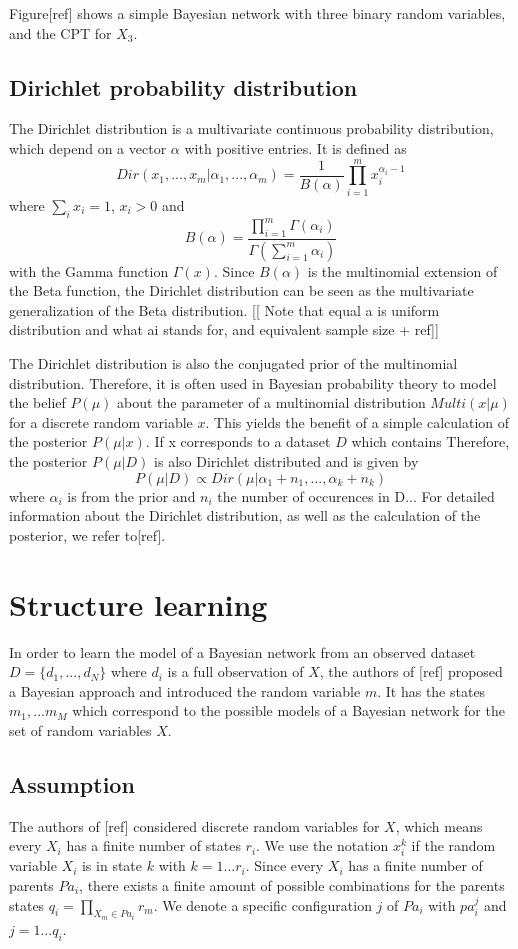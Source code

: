 \documentclass{article}
\begin{document}
	Figure[ref] shows a simple Bayesian network with three binary random variables, and
	the CPT for $X_3$.	
	 
	\subsection{Dirichlet probability distribution}
	The Dirichlet distribution is a multivariate continuous probability distribution, which depend on a
	vector $\alpha$ with positive entries. It is defined as
	\[
		Dir(x_1,...,x_m|\alpha_1, ..., \alpha_{m})=\frac{1}{B(\alpha)}\prod_{i=1}^m x_i^{\alpha_i -1}
	\]
	where $\sum_i x_i = 1$, $x_i>0$ and 
	\[
		B(\alpha)=\frac{\prod_{i=1}^m\Gamma(\alpha_i)}{\Gamma(\sum_{i=1}^m \alpha_i)}
	\]
	with the Gamma function $\Gamma(x)$. Since $B(\alpha)$ is the multinomial extension of the Beta function,
	the Dirichlet distribution can be seen as the	multivariate generalization of the Beta distribution.
	[[ Note that equal a is uniform distribution and what ai stands for, and equivalent sample size + ref]]
	
	The Dirichlet distribution is also the conjugated prior of the multinomial distribution.
	Therefore, it is often used in Bayesian probability theory to model the belief $P(\mu)$ about the
	parameter of a multinomial distribution $Multi(x|\mu)$ for a discrete random variable $x$.
	This yields the benefit of a simple calculation of the posterior $P(\mu|x)$. If x corresponds to
	a dataset $D$ which contains
	Therefore, the posterior $P(\mu|D)$ is also Dirichlet distributed and is given by
	\[
		P(\mu|D) \propto Dir(\mu|\alpha_1+n_1, ..., \alpha_k+n_k)
	\]	
	where $\alpha_i$ is from the prior and $n_i$ the number of occurences in D...
	For detailed information about the Dirichlet distribution, as well as the calculation of the
	posterior, we refer to[ref].

\section{Structure learning}
	In order to learn the model of a Bayesian network 
	from an observed dataset $D=\{d_1,...,d_N\}$ where $d_i$ is a full observation of $X$,
	the authors of [ref]	proposed a Bayesian approach 
	and introduced the random variable $m$. It has the states $m_1,...m_M$ which correspond to the 
	possible models of a Bayesian network for the set of random variables $X$.
	
	\subsection{Assumption}
	The authors of [ref] considered discrete random variables for $X$, which means	every $X_i$ has a
	finite number of	states $r_i$. We use the notation $x_i^k$ if the random variable $X_i$ is in state $k$
	with $k = 1...r_i$. Since every $X_i$ has a finite number of parents $Pa_i$, there exists
	a finite amount of possible combinations for the parents states $q_i=\prod_{X_m \in Pa_i} r_m$.
	We denote a specific configuration $j$ of $Pa_i$ with $pa_i^j$ and $j=1...q_i$. 
	
\end{document}

